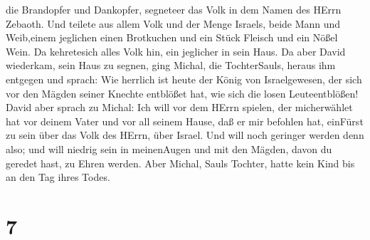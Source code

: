 die Brandopfer und Dankopfer, segneteer das Volk in dem Namen des HErrn
Zebaoth.  Und teilete aus allem Volk und der Menge Israels,
beide Mann und Weib,einem jeglichen einen Brotkuchen und ein Stück
Fleisch und ein Nößel Wein. Da kehretesich alles Volk hin, ein jeglicher
in sein Haus.  Da aber David wiederkam, sein Haus zu
segnen, ging Michal, die TochterSauls, heraus ihm entgegen und sprach:
Wie herrlich ist heute der König von Israelgewesen, der sich vor den
Mägden seiner Knechte entblößet hat, wie sich die losen Leuteentblößen!
 David aber sprach zu Michal: Ich will vor dem HErrn
spielen, der micherwählet hat vor deinem Vater und vor all seinem Hause,
daß er mir befohlen hat, einFürst zu sein über das Volk des HErrn, über
Israel.  Und will noch geringer werden denn also; und will
niedrig sein in meinenAugen und mit den Mägden, davon du geredet hast,
zu Ehren werden.  Aber Michal, Sauls Tochter, hatte kein
Kind bis an den Tag ihres Todes.

\hypertarget{section-6}{%
\section{7}\label{section-6}}

